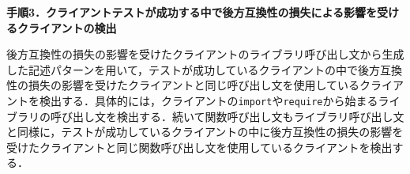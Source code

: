 \documentclass[T,J]{fose} %
\begin{document}
\noindent\textbf{手順3．クライアントテストが成功する中で後方互換性の損失による影響を受けるクライアントの検出}

後方互換性の損失の影響を受けたクライアントのライブラリ呼び出し文から生成した記述パターンを用いて，テストが成功しているクライアントの中で後方互換性の損失の影響を受けたクライアントと同じ呼び出し文を使用しているクライアントを検出する．具体的には，クライアントの\texttt{import}や\texttt{require}から始まるライブラリの呼び出し文を検出する．続いて関数呼び出し文もライブラリ呼び出し文と同様に，テストが成功しているクライアントの中に後方互換性の損失の影響を受けたクライアントと同じ関数呼び出し文を使用しているクライアントを検出する．





\end{document}
